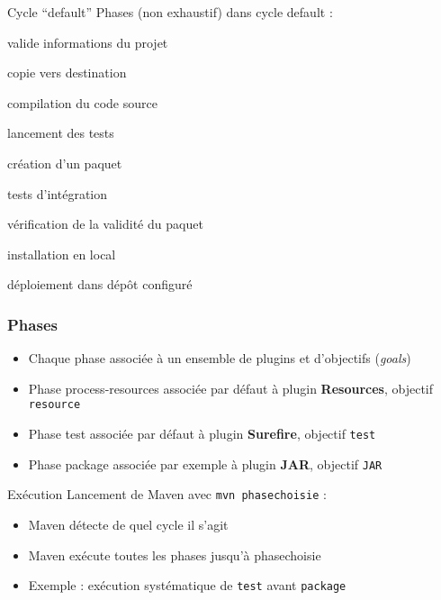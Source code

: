 \documentclass[english, french]{beamer}
\begin{document}
\begin{frame}{Cycle “default”}
	Phases {\tiny (non exhaustif)} dans cycle \og{}default\fg{} :
	\begin{description}
		\item[validate] valide informations du projet
		\item[process-resources] copie vers destination
		\item[compile] compilation du code source
		\item[test] lancement des tests
		\item[package] création d’un paquet
		\item[integration-test] tests d’intégration
		\item[verify] vérification de la validité du paquet
		\item[install] installation en local
		\item[deploy] déploiement dans dépôt configuré
	\end{description}
\end{frame}

\begin{frame}
	\frametitle{Phases}
	\begin{itemize}
		\item Chaque phase associée à un ensemble de plugins et d’objectifs (\emph{goals})
		\item Phase process-resources associée {\tiny par défaut} à plugin \textbf{Resources}, objectif \texttt{resource}
		\item Phase test associée {\tiny par défaut} à plugin \textbf{Surefire}, objectif \texttt{test}
		\item Phase package associée {\tiny par exemple} à plugin \textbf{JAR}, objectif \texttt{JAR}
	\end{itemize}
	\begin{block}{Exécution}
		Lancement de Maven avec \texttt{mvn phasechoisie} :
		\begin{itemize}
			\item Maven détecte de quel cycle il s’agit
			\item Maven exécute toutes les phases jusqu’à \og{}phasechoisie\fg{}
			\item Exemple : exécution systématique de \texttt{test} avant \texttt{package}
		\end{itemize}
	\end{block}
\end{frame}
\end{document}
